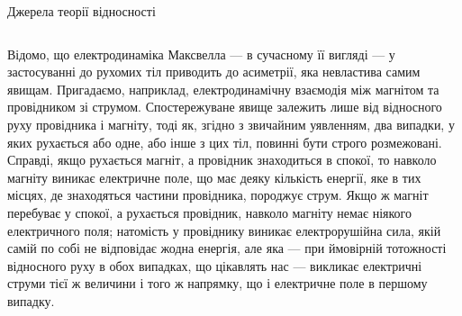 \documentclass[]{beamer}
\begin{document}
\begin{frame}{Джерела теорії відносності}{}
\begin{columns}
\begin{column}{0.45\linewidth}
\begin{block}{}
				\hspace*{2em}Відомо, що {\color{red}електродинаміка Максвелла --- в сучасному її вигляді --- у застосуванні до рухомих тіл приводить до асиметрії, яка невластива самим явищам}. Пригадаємо, наприклад, електродинамічну взаємодія між магнітом та провідником зі струмом. {\color{red}Спостережуване явище залежить лише від відносного руху провідника і магніту, тоді як, згідно з звичайним уявленням, два випадки, у яких рухається або одне, або інше з цих тіл, повинні бути строго розмежовані}. Справді, {\color{blue}якщо рухається магніт, а провідник знаходиться в спокої, то навколо магніту виникає електричне поле}, що має деяку кількість енергії, яке в тих місцях, де знаходяться частини провідника, породжує струм. {\color{blue}Якщо ж магніт перебуває у спокої, а рухається провідник, навколо магніту немає ніякого електричного поля}; натомість у провіднику виникає електрорушійна сила, якій самій по собі не відповідає жодна енергія, але яка --- при ймовірній тотожності відносного руху в обох випадках, що цікавлять нас --- викликає електричні струми тієї ж величини і того ж напрямку, що і електричне поле в першому випадку.
			\end{block}
		\end{column}
	\end{columns}
\end{frame}
\end{document}
